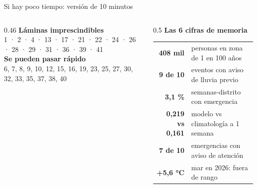 \documentclass[aspectratio=169,10pt]{beamer}
\begin{document}
\begin{frame}{Si hay poco tiempo: versión de 10 minutos}
\begin{columns}[T]
\begin{column}{0.46\textwidth}\small
\textbf{Láminas imprescindibles}\\
1 · 2 · 4 · 13 · 17 · 21 · 22 · 24 · 26 · 28 · 29 · 31 · 36 · 39 · 41\\[6pt]
\textbf{Se pueden pasar rápido}\\
6, 7, 8, 9, 10, 12, 15, 16, 19, 23, 25, 27, 30, 32, 33, 35, 37, 38, 40
\end{column}
\begin{column}{0.5\textwidth}\small
\textbf{Las 6 cifras de memoria}\\[3pt]
\begin{tabular}{@{}rl@{}}
\textbf{408 mil} & personas en zona de 1 en 100 años\\
\textbf{9 de 10} & eventos con aviso de lluvia previo\\
\textbf{3,1 \%} & semanas-distrito con emergencia\\
\textbf{0,219 vs 0,161} & modelo vs climatología a 1 semana\\
\textbf{7 de 10} & emergencias con aviso de atención\\
\textbf{+5,6 °C} & mar en 2026: fuera de rango\\
\end{tabular}
\end{column}
\end{columns}
\end{frame}
\end{document}
